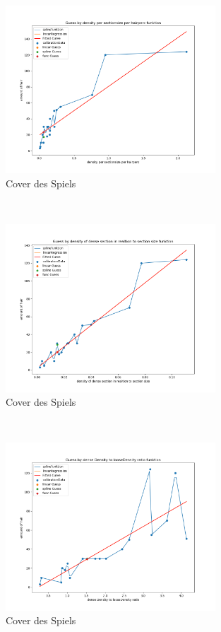\documentclass[german,a4paper,12pt,smallheadings,headsepline, titlepage, liststotoc, idextotoc,bibtoctoc,blibliography = totocnumbered]{scrartcl}
\begin{document}
\begin{figure}
	\centering
	\includegraphics[width=0.7\textwidth]{figBina/g3.png}
	\caption[]{Cover des Spiels}
	\label{img:Bina01}
\end{figure}\\
\begin{figure}
	\centering
	\includegraphics[width=0.7\textwidth]{figBina/g4.png}
	\caption[]{Cover des Spiels}
	\label{img:Bina01}
\end{figure}\\
\begin{figure}
	\centering
	\includegraphics[width=0.7\textwidth]{figBina/g5.png}
	\caption[]{Cover des Spiels}
	\label{img:Bina01}
\end{figure}\\
\end{document}
